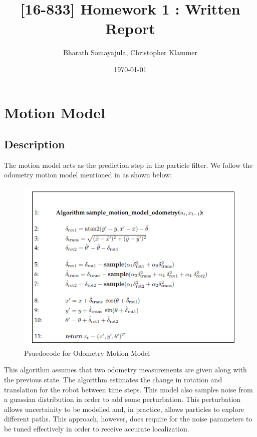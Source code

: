 \documentclass[12pt, a4paper]{article}
\title{[16-833] Homework 1 : Written Report}
\author{Bharath Somayajula, Christopher Klammer}
\date{\today}
\begin{document}
\maketitle

\tableofcontents

\clearpage
\section{Motion Model}
\subsection{Description}
The motion model acts as the prediction step in the particle filter. We follow the odometry motion model mentioned in \cite{ProbRob} as shown below:


\begin{figure}[H]
  \center
  \includegraphics{OdometryMotionModel.png}
  \caption{Psuedocode for Odometry Motion Model \cite{ProbRob}}
\end{figure}

\noindent This algorithm assumes that two odometry measurements are given along with the previous state. The algorithm estimates the change in rotation and translation for the robot between time steps. This model also samples noise from a guassian distribution in order to add some perturbation. This perturbation allows uncertainity to be modelled and, in practice, allows particles to explore different paths. This approach, however, does require for the noise parameters to be tuned effectively in order to receive accurate localization.
\end{document}
